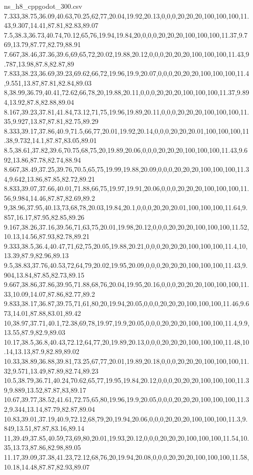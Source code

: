 \begin{filecontents*}[overwrite]{ns_h8_cppgodot_300.csv}
7.333,38.75,36.09,40.63,70.25,62,77,20.04,19.92,20.13,0,0,0,20,20,20,100,100,100,11.43,9.307,14.41,87.81,82.83,89.07
7.5,38.3,36.73,40.74,70.12,65,76,19.94,19.84,20,0,0,0,20,20,20,100,100,100,11.37,9.769,13.79,87.77,82.79,88.91
7.667,38.46,37.36,39.6,69,65,72,20.02,19.88,20.12,0,0,0,20,20,20,100,100,100,11.43,9.787,13.98,87.8,82.87,89
7.833,38.23,36.69,39.23,69.62,66,72,19.96,19.9,20.07,0,0,0,20,20,20,100,100,100,11.4,9.551,13.87,87.81,82.84,89.03
8,38.99,36.79,40.41,72.62,66,78,20,19.88,20.11,0,0,0,20,20,20,100,100,100,11.37,9.894,13.92,87.8,82.88,89.04
8.167,39.23,37.81,41.84,73.12,71,75,19.96,19.89,20.11,0,0,0,20,20,20,100,100,100,11.35,9.927,13.87,87.81,82.75,89.29
8.333,39.17,37.86,40.9,71.5,66,77,20.01,19.92,20.14,0,0,0,20,20,20.01,100,100,100,11.38,9.732,14.1,87.87,83.05,89.01
8.5,38.61,37.82,39.6,70.75,68,75,20,19.89,20.06,0,0,0,20,20,20,100,100,100,11.43,9.692,13.86,87.78,82.74,88.94
8.667,38.49,37.25,39.76,70.5,65,75,19.99,19.88,20.09,0,0,0,20,20,20,100,100,100,11.34,9.642,13.86,87.85,82.72,89.21
8.833,39.07,37.66,40.01,71.88,66,75,19.97,19.91,20.06,0,0,0,20,20,20,100,100,100,11.56,9.984,14.46,87.87,82.69,89.2
9,38.96,37.95,40.13,73,68,78,20.03,19.84,20.1,0,0,0,20,20,20.01,100,100,100,11.64,9.857,16.17,87.95,82.85,89.26
9.167,38.26,37.16,39.56,71,63,75,20.01,19.98,20.12,0,0,0,20,20,20,100,100,100,11.52,10.13,14.56,87.93,82.78,89.21
9.333,38.5,36.4,40.47,71,62,75,20.05,19.88,20.21,0,0,0,20,20,20,100,100,100,11.4,10,13.39,87.9,82.96,89.13
9.5,38.83,37.76,40.53,72,64,79,20.02,19.95,20.09,0,0,0,20,20,20,100,100,100,11.43,9.904,13.84,87.85,82.73,89.15
9.667,38.86,37.86,39.95,71.88,68,76,20.04,19.95,20.16,0,0,0,20,20,20,100,100,100,11.33,10.09,14.07,87.86,82.77,89.2
9.833,38.17,36.87,39.75,71,61,80,20,19.94,20.05,0,0,0,20,20,20,100,100,100,11.46,9.673,14.01,87.88,83.01,89.42
10,38.97,37.71,40.1,72.38,69,78,19.97,19.9,20.05,0,0,0,20,20,20,100,100,100,11.4,9.9,13.55,87.9,82.9,89.03
10.17,38.5,36.8,40.43,72.12,64,77,20,19.89,20.13,0,0,0,20,20,20,100,100,100,11.48,10.14,13.13,87.9,82.89,89.02
10.33,38.89,36.88,39.81,73.25,67,77,20.01,19.89,20.18,0,0,0,20,20,20,100,100,100,11.32,9.571,13.49,87.89,82.74,89.23
10.5,38.79,36.71,40.24,70.62,65,77,19.95,19.84,20.12,0,0,0,20,20,20,100,100,100,11.39,9.889,13.52,87.87,83,89.17
10.67,39.77,38.52,41.61,72.75,65,80,19.96,19.9,20.05,0,0,0,20,20,20,100,100,100,11.32,9.344,13.14,87.79,82.87,89.04
10.83,39.01,37.19,40.9,72.12,68,79,20,19.94,20.06,0,0,0,20,20,20,100,100,100,11.3,9.849,13.51,87.87,83.16,89.14
11,39.49,37.85,40.59,73,69,80,20.01,19.93,20.12,0,0,0,20,20,20,100,100,100,11.54,10.35,13.73,87.86,82.98,89.05
11.17,39.09,37.38,41.23,72.12,68,76,20,19.94,20.08,0,0,0,20,20,20,100,100,100,11.58,10.18,14.48,87.87,82.93,89.07

\end{filecontents*}
